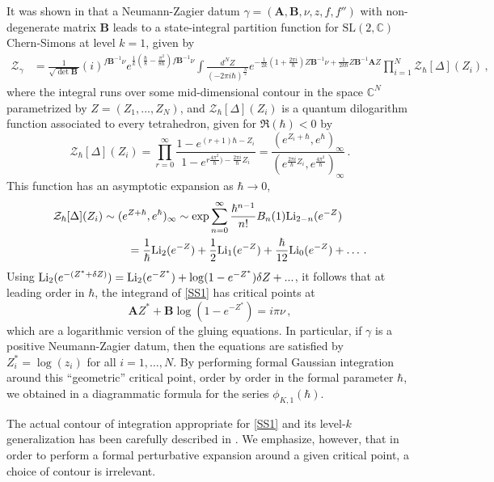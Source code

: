 \documentclass[12pt]{amsart}
\theoremstyle{definition}
\def\BC{\mathbb C}
\def\SL{\mathrm{SL}}
\def\be{  \begin{equation} }
\def\ee{  \end{equation} }
\newcommand{\CZ}{\mathcal{Z}}
\newcommand{\Li}{{\rm Li}}
\newcommand{\mb}{\mathbf}
\begin{document}
It was shown in \cite{Dimofte-QRS, DG} that a Neumann-Zagier datum
$\gamma = (\mb A,\mb B,\nu,z,f,f'')$ 
with non-degenerate matrix $\mb B$ leads to a state-integral partition 
function for $\SL(2,\BC)$ Chern-Simons at level $k=1$, given by
%
\begin{align} 
\CZ_\gamma&= \frac{1}{\sqrt{\det\mb B}}(i)^{f\mb B^{-1}\nu}
  e^{\frac1k(\frac\hbar8-\frac{\pi^2}{8\hbar})f\mb B^{-1}\nu} \int \frac{d^NZ}{
(-2\pi i \hbar)^{\frac N2}}e^{-\frac1{2k}(1+\frac{2\pi i}{\hbar})Z\mb B^{-1}\nu
+\frac1{2k\hbar}Z\mb B^{-1}\mb AZ} \prod_{i=1}^N\CZ_\hbar[\Delta](Z_i) \,,
\label{SS1}
\end{align}
%
where the integral runs over some mid-dimensional contour in the space 
$\BC^N$ parametrized by $Z=(Z_1,...,Z_N)$, and $\CZ_\hbar[\Delta](Z_i)$ is a 
quantum dilogarithm function associated to every tetrahedron, given for 
$\Re(\hbar)<0$ by
%
\be 
\CZ_\hbar[\Delta](Z_i) = \prod_{r=0}^\infty 
\frac{1-e^{(r+1)\hbar-Z_i}}{1-e^{r \frac{4\pi^2}{\hbar})
-\frac{2\pi i}{\hbar}Z_i}}  = \frac{(e^{Z_i+\hbar},
e^\hbar)_\infty}{(e^{\frac{2\pi i}{\hbar}Z_i},
e^{\frac{4\pi^2}{\hbar}})_\infty}\,.
\ee
%
This function has an asymptotic expansion as $\hbar\to 0$,
%
\begin{align}  
\CZ_\hbar[\Delta](Z_i) &\sim (e^{Z+\hbar},e^\hbar)_\infty \sim \exp\sum_{n=0}^\infty 
\frac{\hbar^{n-1}}{n!} B_n(1)\Li_{2-n}(e^{-Z}) \\
& \hspace{.3in}  = \frac1\hbar \Li_2(e^{-Z}) + \frac12\Li_1(e^{-Z}) 
+ \frac\hbar{12}\Li_0(e^{-Z}) + \ldots\,.
\notag
\end{align}
%
Using $\Li_2(e^{-(Z^*+\delta Z)}) = \Li_2(e^{-Z^*}) 
+ \log(1-e^{-Z^*})\delta Z + ...$, it
follows that at leading order in $\hbar$, the integrand of \eqref{SS1} has 
critical points at
%
\be 
\label{CScrit} 
\mb A Z^* +\mb B\log(1-e^{-Z^*}) = i\pi \nu\,, 
\ee
%
which are a logarithmic version of the gluing equations. In particular, 
if $\gamma$ is a positive Neumann-Zagier datum, then the equations are 
satisfied by $Z^*_i=\log (z_i)$ for all $i=1,\dots,N$. By performing formal 
Gaussian integration around this ``geometric'' critical point, order by 
order in the formal parameter $\hbar$, we obtained in \cite{DG} a 
diagrammatic formula for the series $\phi_{K,1}(\hbar)$.

The actual contour of integration appropriate for \eqref{SS1} and its 
level-$k$ generalization has been carefully described in 
\cite{AK-TQFT, D-levelk, AK}. We emphasize, however, that in order to 
perform a formal perturbative expansion around a given critical point, 
a choice of contour is irrelevant.
\end{document}
